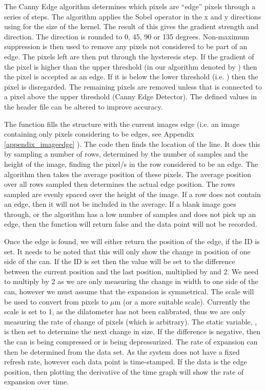 The Canny Edge algorithm\cite{OpenCV_Canny} determines which pixels are ``edge'' pixels through a series of steps.  The algorithm applies the Sobel operator in the x and y directions using  for the size of the kernel.  The result of this gives the gradient strength and direction. The direction is rounded to 0, 45, 90 or 135 degrees. Non-maximum suppression is then used to remove any pixels not considered to be part of an edge.  The pixels left are then put through the hysteresis step.  If the gradient of the pixel is higher than the upper threshold (in our algorithm denoted by ) then the pixel is accepted as an edge.  If it is below the lower threshold (i.e. ) then the pixel is disregarded.  The remaining pixels are removed unless that is connected to a pixel above the upper threshold (Canny Edge Detector). The defined values in the header file can be altered to improve accuracy.

The  function fills the   structure with the current images edge (i.e. an image containing only pixels considering to be edges, see Appendix \ref{appendix_imageedge} ). The code then finds the location of the line.  It does this by sampling a number of rows, determined by the number of samples and the height of the image, finding the pixel/s in the row considered to be an edge.  The algorithm then takes the average position of these pixels.  The average position over all rows sampled then determines the actual edge position.  The rows sampled are evenly spaced over the height of the image.  If a row does not contain an edge, then it will not be included in the average.  If a blank image goes through, or the algorithm has a low number of samples and does not pick up an edge, then the function will return false and the data point will not be recorded.

Once the edge is found, we will either return the position of the edge, if the  ID is set. It needs to be noted that this will only show the change in position of one side of the can.  If the  ID is set then the value will be set to the difference between the current position and the last position, multiplied by  and 2.  We need to multiply by 2 as we are only measuring the change in width to one side of the can, however we must assume that the expansion is symmetrical.  The scale will be used to convert from pixels to $\mu$m (or a more suitable scale).  Currently the scale is set to 1, as the dilatometer has not been calibrated, thus we are only measuring the rate of change of pixels (which is arbitrary). The static variable, , is then set to determine the next change in size.  If the difference is negative, then the can is being compressed or is being depressurized. 
The rate of expansion can then be determined from the data set.  As the system does not have a fixed refresh rate, however each data point is time-stamped.  If the data is the edge position, then plotting the derivative of the time graph will show the rate of expansion over time.

